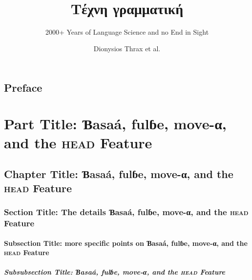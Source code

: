 \documentclass[ number=??
			   ,series=sidl
			   ,output=long   %
			   ,draftmode  
			  ]{langsci}
\title{Τέχνη \newlineCover γραμματική}
\subtitle{2000+ Years of Language Science and no End in Sight}
\author{Dionysios Thrax \newlineCover et al.}
\begin{document}
               
                                                                                    
                                     
\maketitle  
 
\frontmatter 

\chapter*{Preface}

\lipsum[3-10]  	            
     
\tableofcontents    

\part{Part Title: Ɓasaá, fulɓe, move-α, and the \textrm{\textsc{head}} Feature}	               
\chapter{Chapter Title: Ɓasaá, fulɓe, move-α, and the \textrm{\textsc{head}} Feature}
\section{Section Title: The details Ɓasaá, fulɓe, move-α, and the \textrm{\textsc{head}} Feature}
\subsection{Subsection Title: more specific points on Ɓasaá, fulɓe, move-α, and the \textrm{\textsc{head}} Feature}
\subsubsection{Subsubsection Title: Ɓasaá, fulɓe, move-α, and the \textrm{\textsc{head}} Feature}       
   
                                                           
\lipsum 
\lipsum[3-10]  
\end{document}
